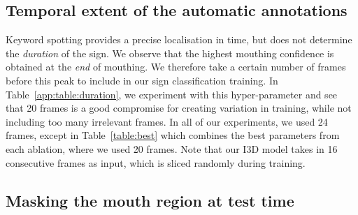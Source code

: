 \subsection{Temporal extent of the automatic annotations} \label{app:subsec:numframes}
Keyword spotting provides a precise localisation in time,
but does not determine the \textit{duration} of the sign. We observe
that the highest mouthing confidence is obtained at the \textit{end}
of mouthing. We therefore take a certain number of frames before
this peak to include in our sign classification training.
In Table~\ref{app:table:duration}, we experiment with this hyper-parameter and see that
20 frames is a good compromise for creating variation in training,
while not including too many irrelevant frames. In all of our
experiments, we used 24 frames, except in
Table~\ref{table:best}
which combines the best parameters from each ablation,
where we used 20 frames.
Note that our I3D
model takes in 16 consecutive frames as input, which is sliced
randomly during training.
\begin{table}[t]
    \centering
    \caption{The effect of the number of frames before the mouthing peak used for training.
        Networks are trained on \datasetName{} with Kinetics initialisation.}
    \label{app:table:duration}
\end{table}


\subsection{Masking the mouth region at test time} \label{app:subsec:mouthmask}

